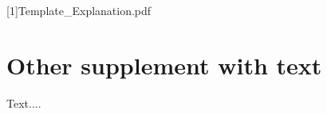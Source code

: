 \begin{appendices}
\renewcommand{\figurename}{Supplementary Figure}
\renewcommand{\tablename}{Supplementary Table}


[1]{Template_Explanation.pdf}
\newpage 


\section{Other supplement with text}
Text....




\end{appendices}